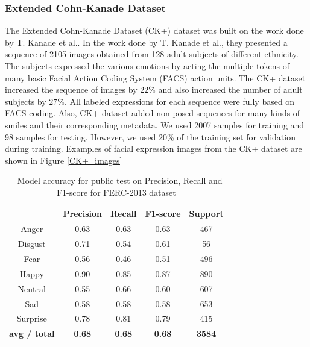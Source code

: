 \documentclass[master]{thesis-uestc}
\begin{document}
\subsubsection*{Extended Cohn-Kanade Dataset}
The Extended Cohn-Kanade Dataset (CK+) dataset was built on the work done by T. Kanade et al.\cite{ck_840611}. In the work done by T. Kanade et al.\cite{ck_840611}, they presented a sequence of 2105 images obtained from 128 adult subjects of different ethnicity. The subjects expressed the various emotions by acting the multiple tokens of many basic Facial Action Coding System (FACS)\cite{ekman_facs} action units. The CK+ dataset increased the sequence of images by $22\%$ and also increased the number of adult subjects by $27\%$. All labeled expressions for each sequence were fully based on FACS coding. Also, CK+ dataset added non-posed sequences for many kinds of smiles and their corresponding metadata. We used 2007 samples for training and 98 samples for testing. However, we used 20\% of the training set for validation during training. Examples of facial expression images from the CK+ dataset are shown in Figure \ref{CK+_images}

\begin{table}[ht]
\renewcommand{\arraystretch}{1.3}
\caption{\,\,\,\,\,Model accuracy for public test on Precision, Recall and F1-score for FERC-2013 dataset}
\label{table_fer2013_scores_public}
\begin{center}
\begin{tabular}{|c|c|c|c|c|}

\hline
 & Precision & Recall & F1-score & Support\\ \hline

Anger & 0.63 & 0.63 & 0.63 & 467\\ \hline
Disgust & 0.71 & 0.54 & 0.61 & 56\\ \hline
Fear & 0.56 & 0.46 & 0.51 & 496\\ \hline
Happy & 0.90 & 0.85 & 0.87 & 890\\ \hline
Neutral & 0.55 & 0.66 & 0.60 & 607\\ \hline
Sad & 0.58 & 0.58 & 0.58 & 653\\ \hline
Surprise & 0.78 & 0.81 & 0.79 & 415\\ \hline

\textbf{avg / total} & \textbf{0.68} & \textbf{0.68} & \textbf{0.68} & \textbf{3584}\\ \hline

\end{tabular}
\end{center}
\end{table}
\end{document}
